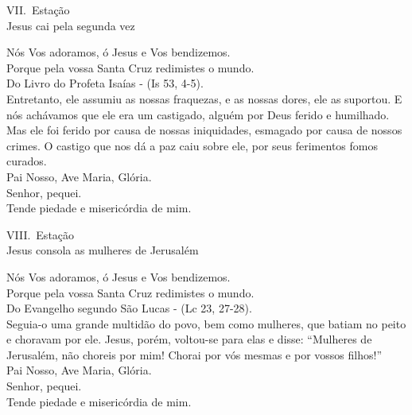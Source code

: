\documentclass{book}
\begin{document}
\newpage
\begin{center}
    VII.\ Estação\\ Jesus cai pela segunda vez
\end{center}
\begin{flushleft}
    \VbarRed{} Nós Vos adoramos, ó Jesus e Vos bendizemos. \\
    \RbarRed{} Porque pela vossa Santa Cruz redimistes o mundo.
    \vspace{.2cm} \\
    Do Livro do Profeta Isaías - (\textcolor{VioletRed2}{Is 53, 4-5}).
    \vspace{.2cm} \\
    Entretanto, ele assumiu as nossas fraquezas, e as nossas dores, ele as suportou. E nós achávamos que ele era um castigado, alguém por Deus ferido e humilhado. Mas ele foi ferido por causa de nossas iniquidades, esmagado por causa de nossos crimes. O castigo que nos dá a paz caiu sobre ele, por seus ferimentos fomos curados.
    \vspace{.2cm} \\
    Pai Nosso, Ave Maria, Glória.
    \vspace{.2cm} \\
    \VbarRed{} Senhor, pequei. \\
    \RbarRed{} Tende piedade e misericórdia de mim.
\end{flushleft}
\begin{center}
    VIII.\ Estação \\ Jesus consola as mulheres de Jerusalém
\end{center}
\begin{flushleft}
    \VbarRed{} Nós Vos adoramos, ó Jesus e Vos bendizemos. \\
    \RbarRed{} Porque pela vossa Santa Cruz redimistes o mundo.
    \vspace{.2cm} \\
    Do Evangelho segundo São Lucas - (\textcolor{VioletRed2}{Lc 23, 27-28}).
    \vspace{.2cm} \\
    Seguia-o uma grande multidão do povo, bem como mulheres, que batiam no peito e choravam por ele. Jesus, porém, voltou-se para elas e disse: ``Mulheres de Jerusalém, não choreis por mim! Chorai por vós mesmas e por vossos filhos!''
    \vspace{.2cm} \\
    Pai Nosso, Ave Maria, Glória.
    \vspace{.2cm} \\
    \VbarRed{} Senhor, pequei. \\
    \RbarRed{} Tende piedade e misericórdia de mim.
\end{flushleft}
\end{document}
